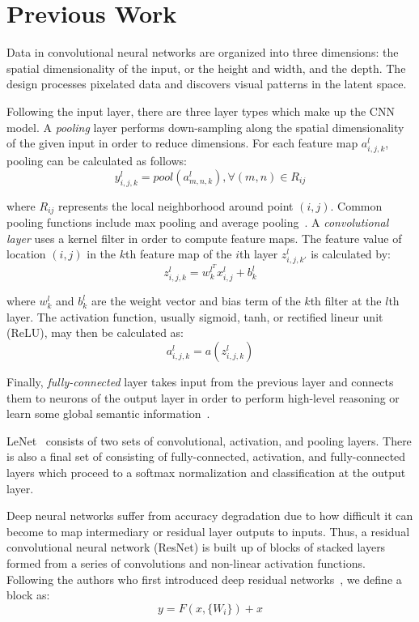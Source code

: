 \section{Previous Work}

Data in convolutional neural networks are organized into three dimensions: the spatial dimensionality of the input, or the height and width, and the depth. The design processes pixelated data and discovers visual patterns in the latent space.

Following the input layer, there are three layer types which make up the CNN model. A \textit{pooling} layer performs down-sampling along the spatial dimensionality of the given input in order to reduce dimensions. For each feature map $a^l_{i, j, k}$, pooling can be calculated as follows:
\begin{equation}
    y^l_{i, j, k} = pool(a^l_{m, n, k}), \forall(m, n) \in R_{ij}
\end{equation}

where $R_{ij}$ represents the local neighborhood around point $(i,j)$. Common pooling functions include max pooling and average pooling~\cite{gu2018recent}. A \textit{convolutional layer} uses a kernel filter in order to compute feature maps. The feature value of location $(i, j)$ in the $k$th feature map of the $i$th layer $z^l_{i, j, k'}$ is calculated by:
\begin{equation}
    z^l_{i, j, k} = w^{l^{T}}_kx^l_{i, j} + b^l_k
\end{equation}

where $w_k^l$ and $b_k^l$ are the weight vector and bias term of the $k$th filter at the $l$th layer. The activation function, usually sigmoid, tanh, or rectified lineur unit (ReLU), may then be calculated as:
\begin{equation}
    a^l_{i, j, k} = a(z^l_{i, j, k})
\end{equation}

 Finally, \textit{fully-connected} layer takes input from the previous layer and connects them to neurons of the output layer in order to perform high-level reasoning or learn some global semantic information~\cite{OShea2015AnIT}.

LeNet~\cite{lenet} consists of two sets of convolutional, activation, and pooling layers. There is also a final set of consisting of fully-connected, activation, and fully-connected layers which proceed to a softmax normalization and classification at the output layer.

Deep neural networks suffer from accuracy degradation due to how difficult it can become to map intermediary or residual layer outputs to inputs. Thus, a residual convolutional neural network (ResNet) is built up of blocks of stacked layers formed from a series of convolutions and non-linear activation functions. Following the authors who first introduced deep residual networks~\cite{resnet}, we define a block as:
\begin{equation}
    y = F(x, \{W_i\}) + x
\end{equation}

